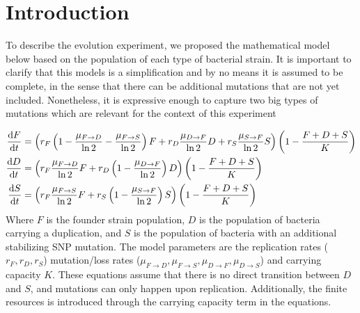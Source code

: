 \documentclass{article}
\begin{document}
\tableofcontents
\newpage


\section{Introduction}

To describe the evolution experiment, we proposed the mathematical model below based on the population of each type of bacterial strain. It is important to clarify that this models is a simplification and by no means it is assumed to be complete, in the sense that there can be additional mutations that are not yet included. Nonetheless, it is expressive enough to capture two big types of mutations which are relevant for the context of this experiment

\begin{subequations}\label{eqs:three_state_model}
\begin{align}
\dv{F}{t} &= \left( r_F\left(1 - \frac{\mu_{F\rightarrow D}}{\ln{2}} - \frac{\mu_{F\rightarrow S}}{\ln{2}}\right)F + r_D \frac{\mu_{D\rightarrow F}}{\ln{2}} D + r_S \frac{\mu_{S\rightarrow F}}{\ln{2}} S \right)\left(1-\frac{F + D + S}{K}\right)\\
\dv{D}{t} &=\left( r_F \frac{\mu_{F\rightarrow D}}{\ln{2}} F + r_D\left(1 - \frac{\mu_{D\rightarrow F}}{\ln{2}}\right)D \right) \left(1-\frac{F + D + S}{K}\right) \\
\dv{S}{t} &= \left( r_F \frac{\mu_{F\rightarrow S}}{\ln{2}} F + r_S\left(1 - \frac{\mu_{S\rightarrow F}}{\ln{2}}\right)S \right) \left(1-\frac{F + D + S}{K}\right) 
\end{align}
\end{subequations}
Where $F$ is the founder strain population, $D$ is the population of bacteria carrying a duplication, and $S$ is the population of bacteria with an additional stabilizing SNP mutation. The model parameters are the replication rates ($r_F, r_D, r_S$) mutation/loss rates ($\mu_{F\rightarrow D}, \mu_{F\rightarrow S}, \mu_{D\rightarrow F}, \mu_{D\rightarrow S}$) and carrying capacity $K$. These equations assume that there is no direct transition between $D$ and $S$, and mutations can only happen upon replication. Additionally, the finite resources is introduced through the carrying capacity term in the equations.
\end{document}
